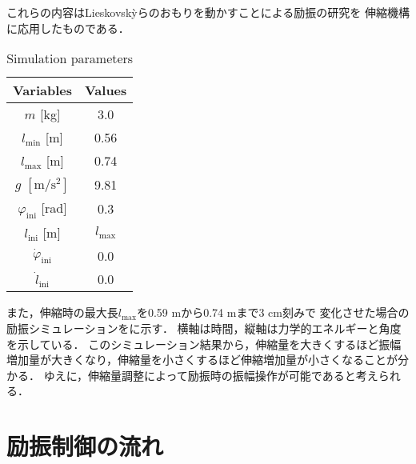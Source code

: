           これらの内容はLieskovsk{\`y}らのおもりを動かすことによる励振の研究\cite{lieskovsky2023optimal}を
          伸縮機構に応用したものである．
          \begin{table}[tb]
            \begin{center}
              \caption{Simulation parameters}
              \vspace{2mm}
              \begin{tabular}{c|c}
                \hline
                Variables & Values \\
                \hline
                $m$ [kg] & 3.0 \\
                $l_{\mathrm{min}}$ [m] & 0.56 \\
                $l_{\mathrm{max}}$ [m] & 0.74 \\
                $g$ $\mathrm{[m/s^2]}$ & 9.81 \\
                $\varphi_{\mathrm{ini}}$ [rad] & 0.3 \\
                $l_{\mathrm{ini}}$ [m]& $l_{\mathrm{max}}$ \\
                $\dot{\varphi}_{\mathrm{ini}}$ & 0.0 \\
                $\dot{l}_{\mathrm{ini}}$ & 0.0 \\
                \hline
              \end{tabular}
            \end{center}
          \end{table}
          
          また，伸縮時の最大長$l_{\mathrm{max}}$を0.59 mから0.74 mまで3 cm刻みで
          変化させた場合の励振シミュレーションをに示す．
          横軸は時間，縦軸は力学的エネルギーと角度を示している．
          このシミュレーション結果から，伸縮量を大きくするほど振幅増加量が大きくなり，伸縮量を小さくするほど伸縮増加量が小さくなることが分かる．
          ゆえに，伸縮量調整によって励振時の振幅操作が可能であると考えられる．
        
          

        \section{励振制御の流れ}

